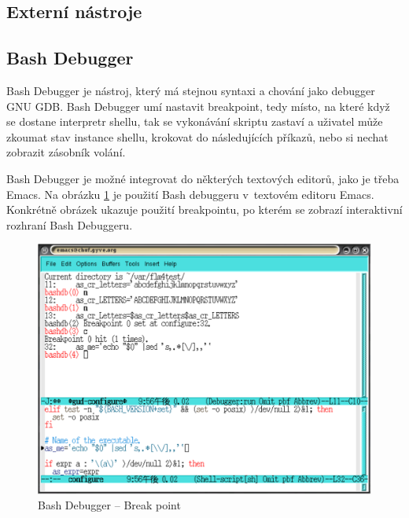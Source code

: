 \documentclass[thesis=M,czech]{FITthesis}[2012/06/26]
\begin{document}


\subsection{Externí nástroje}



\subsection{Bash Debugger}

Bash Debugger \cite{bashdb} je nástroj, který má stejnou syntaxi a chování jako debugger GNU GDB. Bash Debugger umí nastavit breakpoint, tedy místo, na které když se dostane interpretr shellu, tak se vykonávání skriptu zastaví a uživatel může zkoumat stav instance shellu, krokovat do následujících příkazů, nebo si nechat zobrazit zásobník volání.

Bash Debugger je možné integrovat do některých textových editorů, jako je třeba Emacs. Na obrázku \ref{fig:bashdb} je použití Bash debuggeru v~textovém editoru Emacs. Konkrétně obrázek ukazuje použití breakpointu, po kterém se zobrazí interaktivní rozhraní Bash Debuggeru.


\begin{figure}[htb]\centering
	\includegraphics[width=\textwidth]{./images/bashdb-break_invert}
	\caption{Bash Debugger -- Break point \cite{bashdb}}
	\label{fig:bashdb}
\end{figure}
\end{document}
